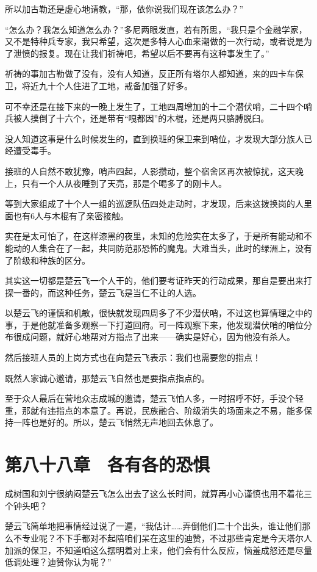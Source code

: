 所以加古勒还是虚心地请教，“那，依你说我们现在该怎么办？”

“怎么办？我怎么知道怎么办？”多尼两眼发直，若有所思，“我只是个金融学家，又不是特种兵专家，我只希望，这次是多特人心血来潮做的一次行动，或者说是为了泄愤的报复。现在让我们祈祷吧，希望以后不要再有这种事发生了。”

祈祷的事加古勒做了没有，没有人知道，反正所有塔尔人都知道，来的四卡车保卫，将近九十个人住进了工地，戒备加强了好多。

可不幸还是在接下来的一晚上发生了，工地四周增加的十二个潜伏哨，二十四个哨兵被人摸倒了十六个，还是带有“嘎都因”的木棍，还是两只胳膊脱臼。

没人知道这事是什么时候发生的，直到换班的保卫来到哨位，才发现大部分族人已经遭受毒手。

接班的人自然不敢犹豫，哨声四起，人影攒动，整个宿舍区再次被惊扰，这天晚上，只有一个人从夜睡到了天亮，那是个喝多了的刚卡人。

等到大家组成了十个人一组的巡逻队伍四处走动时，才发现，后来这拨换岗的人里面也有6人与木棍有了亲密接触。

实在是太可怕了，在这样漆黑的夜里，未知的危险实在太多了，于是所有能动和不能动的人集合在了一起，共同防范那恐怖的魔鬼。大难当头，此时的绿洲上，没有了阶级和种族的区分。

其实这一切都是楚云飞一个人干的，他们要考证昨天的行动成果，那自是要出来打探一番的，而这种任务，楚云飞是当仁不让的人选。

以楚云飞的谨慎和机敏，很快就发现四周多了不少潜伏哨，不过这也算情理之中的事，于是他就准备多观察一下打道回府。可一阵观察下来，他发现潜伏哨的哨位分布很成问题，就好心地帮对方指点了出来——确实是好心，因为他没有杀人。

然后接班人员的上岗方式也在向楚云飞表示：我们也需要您的指点！

既然人家诚心邀请，那楚云飞自然也是要指点指点的。

至于众人最后在营地众志成城的邀请，楚云飞怕人多，一时招呼不好，手没个轻重，那就有违指点的本意了。再说，民族融合、阶级消失的场面来之不易，能多保持一阵也是好的。所以，楚云飞悄然无声地回去休息了。

\section{第八十八章　各有各的恐惧}

成树国和刘宁很纳闷楚云飞怎么出去了这么长时间，就算再小心谨慎也用不着花三个钟头吧？

楚云飞简单地把事情经过说了一遍，“我估计……弄倒他们二十个出头，谁让他们那么不专业呢？不下手都对不起陪咱们呆在这里的迪赞，不过那些肯定是今天塔尔人加派的保卫，不知道咱这么摆明着对上来，他们会有什么反应，恼羞成怒还是尽量低调处理？迪赞你认为呢？”

